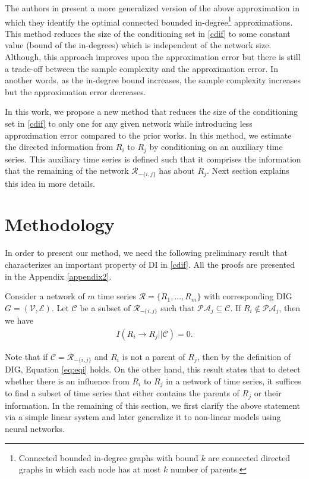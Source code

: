 The authors in \citet{quinn2015bounded} present a more generalized version of the above approximation in which they identify the optimal connected bounded in-degree\footnote{Connected bounded in-degree graphs with bound $k$ are connected directed graphs in which each node has at most $k$ number of parents.} approximations.  
This method reduces the size of the conditioning set in \eqref{cdif} to some constant value (bound of the in-degrees) which is independent of the network size. 
Although, this approach improves upon the approximation error but there is still a trade-off between the sample complexity and the approximation error. In another words, as the in-degree bound increases, the sample complexity increases but the approximation error decreases.


In this work, we propose a new method that reduces the size of the conditioning set in \eqref{cdif} to only one for any given network while introducing less approximation error compared to the prior works. 
In this method, we estimate the directed information from $R_i$ to $R_j$ by conditioning on an auxiliary time series. This auxiliary time series is defined such that it comprises the information that the remaining of the network $\mathcal{R}_{-\{i,j\}}$ has about $R_j$.
Next section explains this idea in more details.



\section{Methodology}\label{sec:method}

In order to present our method, we need the following preliminary result that characterizes an important property of DI in \eqref{cdif}. All the proofs are presented in the Appendix \ref{appendix2}.

\begin{lemma}\label{lemma:small}
Consider a network of $m$ time series $\mathcal{R}=\{R_1,...,R_m\}$ with corresponding DIG $G=(\mathcal{V},\mathcal{E})$. Let $\mathcal{C}$ be a subset of $\mathcal{R}_{-\{i,j\}}$ such that $\mathcal{PA}_j\subseteq \mathcal{C}$. If $R_i\not\in\mathcal{PA}_j$, then we have
\begin{align}\label{eq:eqi}
I(R_i\rightarrow R_j||\mathcal{C})=0.
\end{align}
\end{lemma}
Note that if $\mathcal{C}=\mathcal{R}_{-\{i,j\}}$ and $R_i$ is not a parent of $R_j$, then by the definition of DIG, Equation  \eqref{eq:eqi} holds.
On the other hand, this result states that to detect whether there is an influence from $R_i$ to $R_j$ in a network of time series, it suffices to find a subset of time series that either contains the parents of $R_j$ or their information.
In the remaining of this section, we first clarify the above statement via a simple linear system and later generalize it to non-linear models using neural networks.

